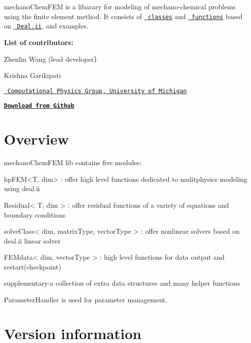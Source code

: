 mechano\+Chem\+F\+EM is a libarary for modeling of mechano-\/chemical problems using the finite element method. It consists of \href{https://htmlpreview.github.io/?https://raw.githubusercontent.com/mechanoChem/mechanoChemFEM/master/doxygen/html/annotated.html}{\texttt{ classes}} and \href{https://htmlpreview.github.io/?https://raw.githubusercontent.com/mechanoChem/mechanoChemFEM/master/doxygen/html/modules.html}{\texttt{ functions}} based on \href{https://www.dealii.org/}{\texttt{ Deal.\+ii}}, and examples.

{\bfseries{List of contributors\+:}}~\newline


Zhenlin Wang (lead developer）~\newline


Krishna Garikipati~\newline


\href{http://umich.edu/~compphys/index.html}{\texttt{ Computational Physics Group, University of Michigan}}

\href{https://github.com/mechanoChem/mechanoChemFEM}{\texttt{ {\bfseries{Download from Github}}}}

\section*{{\bfseries{Overview}}~\newline
 }

mechano\+Chem\+F\+EM lib contains five modules\+:

\begin{DoxyVerb}hpFEM<T, dim> : offer high level functions dedicated to mulitphysics modeling using deal.ii

Residual< T, dim > : offer residual functions of a variety of equations and boundary conditions

solveClass< dim, matrixType, vectorType > : offer nonlinear solvers based on deal.ii linear solver

FEMdata< dim, vectorType > : high level functions for data output and restart(checkpoint)

supplementary:a collection of extra data structures and many helper functions
\end{DoxyVerb}


Parameter\+Handler is used for parameter management.

\section*{{\bfseries{Version information}}~\newline
 }

